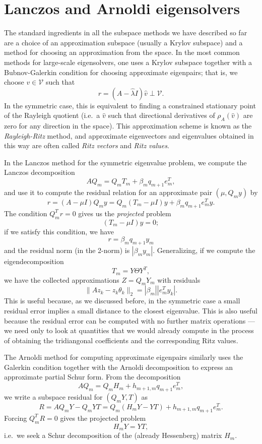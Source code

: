 \documentclass[12pt, leqno]{article} %
\begin{document}

\section{Lanczos and Arnoldi eigensolvers}

The standard ingredients in all the subspace methods we have
described so far are a choice of an approximation subspace
(usually a Krylov subspace) and a method for choosing an approximation
from the space.  In the most common methods for large-scale eigensolvers,
one uses a Krylov subspace together with a Bubnov-Galerkin condition
for choosing approximate eigenpairs; that is, we choose $v \in \mathcal{V}$
such that
\[
  r = (A-\hat{\lambda} I) \hat{v} \perp \mathcal{V}.
\]
In the symmetric case, this is equivalent to finding a constrained
stationary point of the Rayleigh quotient (i.e.~a $\hat{v}$ such that
directional derivatives of $\rho_A(\hat{v})$ are zero for any direction
in the space).  This approximation scheme is known as the {\em
Rayleigh-Ritz} method, and approximate eigenvectors and eigenvalues
obtained in this way are often called {\em Ritz vectors} and {\em Ritz
values}.

In the Lanczos method for the symmetric eigenvalue problem,
we compute the Lanczos decomposition
\[
  AQ_m = Q_m T_m + \beta_m q_{m+1} e_m^T,
\]
and use it to compute the residual relation for an approximate pair
$(\mu, Q_m y)$ by
\[
  r = (A-\mu I) Q_m y = Q_m (T_m-\mu I) y + \beta_m q_{m+1} e_m^T y.
\]
The condition $Q_m^T r = 0$ gives us the {\em projected} problem
\[
  (T_m-\mu I) y = 0;
\]
if we satisfy this condition, we have
\[
  r = \beta_m q_{m+1} y_m
\]
and the residual norm (in the 2-norm) is $|\beta_m y_m|$.  Generalizing,
if we compute the eigendecomposition
\[
  T_m = Y \Theta Y^T,
\]
we have the collected approximations $Z = Q_m Y_m$ with residuals
\[
  \|Az_k-z_k \theta_k\|_2 = |\beta_m| |e_m^T y_k|.
\]
This is useful because, as we discussed before, in the symmetric case
a small residual error implies a small distance to the closest eigenvalue.
This is also useful because the residual error can be computed with no
further matrix operations --- we need only to look at quantities that
we would already compute in the process of obtaining the tridiangonal
coefficients and the corresponding Ritz values.

The Arnoldi method for computing approximate eigenpairs similarly uses
the Galerkin condition together with the Arnoldi decomposition to
express an approximate partial Schur form.  From the decomposition
\[
  AQ_m = Q_m H_m + h_{m+1,m} q_{m+1} e_m^T,
\]
we write a subspace residual for $(Q_m Y, T)$ as
\[
  R = AQ_m Y - Q_m Y T = Q_m (H_m Y - Y T) + h_{m+1,m} q_{m+1} e_m^T.
\]
Forcing $Q_m^T R = 0$ gives the projected problem
\[
  H_m Y = Y T,
\]
i.e.~we seek a Schur decomposition of the (already Hessenberg)
matrix $H_m$.
\end{document}

